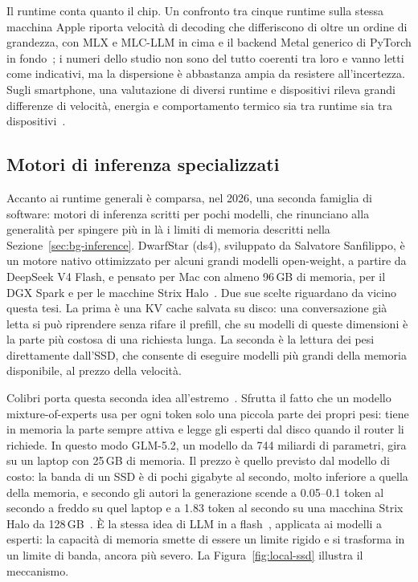 Il runtime conta quanto il chip. Un confronto tra cinque runtime sulla stessa macchina Apple riporta velocità di decoding
che differiscono di oltre un ordine di grandezza, con MLX e MLC-LLM in cima e il backend Metal generico di PyTorch in
fondo~\cite{rajesh2025apple}; i numeri dello studio non sono del tutto coerenti tra loro e vanno letti come indicativi,
ma la dispersione è abbastanza ampia da resistere all'incertezza. Sugli smartphone, una valutazione di diversi runtime e
dispositivi rileva grandi differenze di velocità, energia e comportamento termico sia tra runtime sia tra
dispositivi~\cite{laskaridis2024melting}.

\subsection{Motori di inferenza specializzati}
\label{sec:local-engines}

Accanto ai runtime generali è comparsa, nel 2026, una seconda famiglia di software: motori di inferenza scritti per pochi
modelli, che rinunciano alla generalità per spingere più in là i limiti di memoria descritti nella
Sezione~\ref{sec:bg-inference}. DwarfStar (ds4), sviluppato da Salvatore Sanfilippo, è un motore nativo ottimizzato per
alcuni grandi modelli open-weight, a partire da DeepSeek V4 Flash, e pensato per Mac con almeno 96\,GB di memoria, per il
DGX Spark e per le macchine Strix Halo~\cite{antirez2026ds4}. Due sue scelte riguardano da vicino questa tesi. La prima è
una KV cache salvata su disco: una conversazione già letta si può riprendere senza rifare il prefill, che su modelli di
queste dimensioni è la parte più costosa di una richiesta lunga. La seconda è la lettura dei pesi direttamente dall'SSD,
che consente di eseguire modelli più grandi della memoria disponibile, al prezzo della velocità.

Colibri porta questa seconda idea all'estremo~\cite{justvugg2026colibri}. Sfrutta il fatto che un modello
mixture-of-experts usa per ogni token solo una piccola parte dei propri pesi: tiene in memoria la parte sempre attiva e
legge gli esperti dal disco quando il router li richiede. In questo modo GLM-5.2, un modello da 744 miliardi di
parametri, gira su un laptop con 25\,GB di memoria. Il prezzo è quello previsto dal modello di costo: la banda di un SSD
è di pochi gigabyte al secondo, molto inferiore a quella della memoria, e secondo gli autori la generazione scende a
0.05--0.1 token al secondo a freddo su quel laptop e a 1.83 token al secondo su una macchina Strix Halo da
128\,GB~\cite{justvugg2026colibri}. È la stessa idea di LLM in a flash~\cite{alizadeh2024flash}, applicata ai modelli a
esperti: la capacità di memoria smette di essere un limite rigido e si trasforma in un limite di banda, ancora più severo. La
Figura~\ref{fig:local-ssd} illustra il meccanismo.

